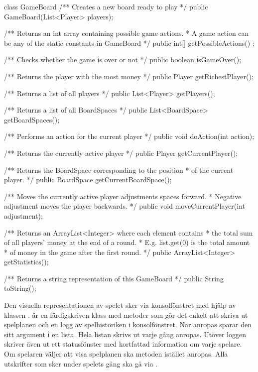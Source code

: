 \begin{JavaSpec}{class GameBoard}
    /** Creates a new board ready to play */
    public GameBoard(List<Player> players);

    /** Returns an int array containing possible game actions.
     *  A game action can be any of the static constants in GameBoard */
    public int[] getPossibleActions() ;
    
    /** Checks whether the game is over or not */
    public boolean isGameOver();
    
    /** Returns the player with the most money */
    public Player getRichestPlayer();

    /** Returns a list of all players */
    public List<Player> getPlayers();

    /** Returns a list of all BoardSpaces */
    public List<BoardSpace> getBoardSpaces();

    /** Performs an action for the current player */
    public void doAction(int action);
 
    /** Returns the currently active player */
    public Player getCurrentPlayer();

    /** Returns the BoardSpace corresponding to the position 
      * of the current player. */
    public BoardSpace getCurrentBoardSpace();

    /** Moves the currently active player adjustments spaces forward.
      * Negative adjustment moves the player backwards. */
    public void moveCurrentPlayer(int adjustment);
    
    /** Returns an ArrayList<Integer> where each element contains
      * the total sum of all players' money at the end of a round.
      * E.g. list.get(0) is the total amount
      * of money in the game after the first round. */
    public ArrayList<Integer> getStatistics();

    /** Returns a string representation of this GameBoard */
    public String toString();
\end{JavaSpec}


Den visuella representationen av spelet sker via konsolfönstret med hjälp av klassen .  är en färdigskriven klass med metoder som gör det enkelt att skriva ut spelplanen och en logg av spelhistoriken i konsolfönstret.
 När  anropas sparar den sitt argument i en lista. Hela listan skrivs ut varje gång  anropas.
Utöver loggen skriver  även ut ett statusfönster med kortfattad information om varje spelare. 
Om spelaren väljer att visa spelplanen ska metoden  istället anropas.
Alla utskrifter som sker under spelets gång ska gå via .
\newline

